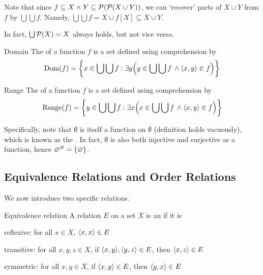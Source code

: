 \documentclass{styles/tufte}
\begin{document}
  Note that since $f \subseteq X \times Y \subseteq \mathcal{P}(\mathcal{P}(X \cup Y))$, we can `recover' parts of $X \cup Y$ from $f$ by $\bigcup\bigcup f$. Namely, $\bigcup\bigcup f = X \cup f[X] \subseteq X \cup Y$.
  
  In fact, $\bigcup \mathcal{P}(X) = X$ always holds, but not vice versa.
  
  \begin{definition}{Domain}{}
    The  of a function $f$ is a set defined using comprehension by
    \[ \domain(f) = \set{x \in \bigcup\bigcup f: \exists y \left(y \in \bigcup\bigcup f \,\land \opair{x, y} \in f\right)} \]
  \end{definition}
  
  \begin{definition}{Range}{}
    The  of a function $f$ is a set defined using comprehension by
    \[ \range(f) = \set{y \in \bigcup\bigcup f: \exists x \left(x \in \bigcup\bigcup f \,\land \opair{x, y} \in f\right)} \]
  \end{definition}
  
  Specifically, note that $\emptyset$ is itself a function on $\emptyset$ (definition holds vacuously), which is known as the . In fact, $\emptyset$ is also both injective and surjective as a function, hence $\emptyset^\emptyset = \set{\emptyset}$.


\subsection{Equivalence Relations and Order Relations}

  We now introduce two specific relations.
  
  \begin{definition}{Equivalence relation}{}
    A relation $E$ on a set $X$ is an  if it is
    \begin{romanenum}
      \item reflexive: for all $x \in X$, $\langle x, x\rangle \in E$
      \item transitive: for all $x, y, z \in X$, if $\langle x, y\rangle, \langle y, z\rangle \in E$, then $\langle x, z\rangle \in E$
      \item symmetric: for all $x, y \in X$, if $\langle x, y\rangle \in E$, then $\langle y, x\rangle \in E$
    \end{romanenum}
  \end{definition}
  
\end{document}
